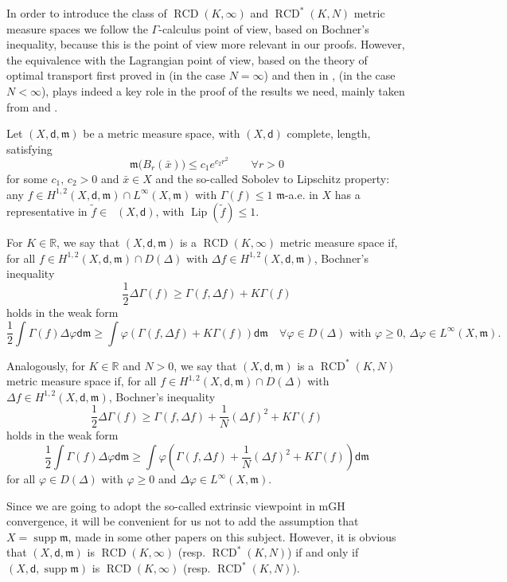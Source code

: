 \documentclass[a4paper,11pt,reqno]{article}
\numberwithin{equation}{section}
\theoremstyle{plain}
\theoremstyle{definition}
\theoremstyle{remark}
\newcommand{\setR}{\mathbb{R}}
\let\altphi\phi
\let\phi\varphi
\let\varphi\altphi
\let\altphi\undefined
\DeclareMathOperator{\supp}{supp}
\DeclareMathOperator{\Lip}{Lip}
\DeclareMathOperator{\Lipb}{Lip_b}
\newcommand{\dist}{\mathsf{d}}
\newcommand{\meas}{\mathfrak{m}}
\DeclareMathOperator{\RCD}{RCD}
\begin{document}
In order to introduce the class of $\RCD(K,\infty)$ and $\RCD^*(K,N)$ metric measure spaces we follow the
$\Gamma$-calculus point of view, based on Bochner's inequality, because this is the point of view more relevant
in our proofs. However, the equivalence with the Lagrangian point
of view, based on the theory of optimal transport first proved in \cite{AmbrosioGigliSavare15} (in the case $N=\infty$) and then in
\cite{ErbarKuwadaSturm}, \cite{AmbrosioMondinoSavare} (in the case $N<\infty$), 
plays indeed a key role in the proof of the results we need, mainly taken from \cite{GigliMondinoSavare13} 
and \cite{AmbrosioHonda}. 

\begin{definition} [$\RCD$ spaces]\label{def:RCDspaces} Let $(X,\dist,\meas)$ be a metric measure space, with $(X,\dist)$ complete, length,
satisfying
\begin{equation}\label{eq:Grygorian}
\meas\bigl(B_r(\bar x)\bigr)\leq c_1 e^{c_2r^2}\qquad\forall r>0
\end{equation}
for some $c_1,\,c_2>0$ and $\bar x\in X$ and the so-called Sobolev to Lipschitz property:  any  
$f\in H^{1,2}(X,\dist,\meas)\cap L^\infty(X,\meas)$ with $\Gamma(f)\leq 1$ $\meas$-a.e. in $X$ 
has a representative in $\tilde{f}\in\Lipb(X,\dist)$, with $\Lip(\tilde f)\leq 1$.

For $K\in\setR$, 
we say that $(X,\dist,\meas)$ is a $\RCD(K,\infty)$ metric measure space if, 
for all $f\in H^{1,2}(X,\dist,\meas)\cap D(\Delta)$ with $\Delta f\in H^{1,2}(X,\dist,\meas)$,
 Bochner's inequality
$$
\frac 12\Delta\Gamma(f)\geq \Gamma(f,\Delta f)+K\Gamma(f) 
$$
holds in the weak form
$$
\frac 12\int \Gamma(f)\Delta\phi\dist\meas\geq
\int\phi(\Gamma(f,\Delta f)+K\Gamma(f))\dist\meas 
\quad\forall \phi\in D(\Delta)\,\,\text{with $\phi\geq 0$,}\,\,\Delta\phi\in L^\infty(X,\meas).
$$

Analogously, for $K\in\setR$ and $N>0$, we say that $(X,\dist,\meas)$ is a $\RCD^*(K,N)$ metric 
measure space if, for all $f\in H^{1,2}(X,\dist,\meas)\cap D(\Delta)$ with $\Delta f\in H^{1,2}(X,\dist,\meas)$, 
Bochner's inequality
$$
\frac 12\Delta\Gamma(f)\geq \Gamma(f,\Delta f)+\frac 1N(\Delta f)^2+K\Gamma(f) 
$$
holds in the weak form
$$
\frac 12\int \Gamma(f)\Delta\phi\dist\meas\geq
\int\phi(\Gamma(f,\Delta f)+\frac 1N(\Delta f)^2+K\Gamma(f))\dist\meas 
$$
for all $\phi\in D(\Delta)$ with $\phi\geq 0$ and $\Delta\phi\in L^\infty(X,\meas)$.
\end{definition}

Since we are going to adopt the so-called extrinsic viewpoint in mGH convergence,  it will be convenient for us
not to add the assumption that $X=\supp\meas$, made in some other papers on this subject.
However, it is obvious that $(X,\dist,\meas)$ is $\RCD(K,\infty)$ (resp. $\RCD^*(K,N)$) if and only if
$(X,\dist,\supp\meas)$ is $\RCD(K,\infty)$ (resp. $\RCD^*(K,N)$).
\end{document}

